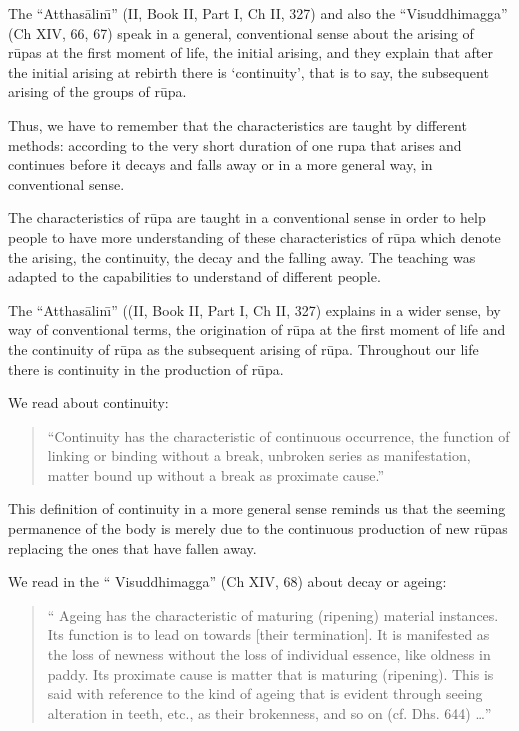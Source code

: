 \documentclass{book}
\begin{document}
The ``Atthas{\=a}lin\=\i'' (II, Book II, Part I, Ch II, 327) and also
the ``Visuddhimagga'' (Ch XIV, 66, 67) speak in a general, conventional
sense about the arising of r\=upas at the first moment of life, the
initial arising, and they explain that after the initial arising at
rebirth there is `continuity', that is to say, the subsequent arising
of the groups of r\=upa. 

Thus, we have to remember that the characteristics are taught by
different methods: according to the very short duration of one rupa
that arises and continues before it decays and falls away or in a more
general way, in conventional sense. 

The characteristics of r\=upa are taught in a conventional sense in
order to help people to have more understanding of these
characteristics of r\=upa which denote the arising, the continuity, the
decay and the falling away. The teaching was adapted to the
capabilities to understand of different people. 

The ``Atthas{\=a}lin\=\i'' ((II, Book II, Part I, Ch II, 327)
explains in a wider sense, by way of conventional terms, the
origination of r\=upa at the first moment of life and the continuity of
r\=upa as the subsequent arising of r\=upa. Throughout our life there
is continuity in the production of r\=upa.

We read about continuity:




\begin{quote}\begin{flushleft}
``Continuity has the characteristic of continuous occurrence, the
function of linking or binding without a break, unbroken series as
manifestation, matter bound up without a break as proximate cause.''

\end{flushleft}\end{quote}



This definition of continuity in a more general sense reminds us that
the seeming permanence of the body is merely due to the continuous
production of new r\=upas replacing the ones that have fallen away.




We read in the `` Visuddhimagga'' (Ch XIV, 68) about decay or ageing:




\begin{quote}\begin{flushleft}
`` Ageing has the characteristic
of maturing (ripening) material instances. Its function is to lead on
towards [their termination]. It is manifested as the loss of newness
without the loss of individual essence, like oldness in paddy. Its
proximate cause is matter that is maturing (ripening). This is said
with reference to the kind of ageing that is evident through seeing
alteration in teeth, etc., as their brokenness, and so on (cf. Dhs.
644) \ldots''
\end{flushleft}\end{quote}
\end{document}
